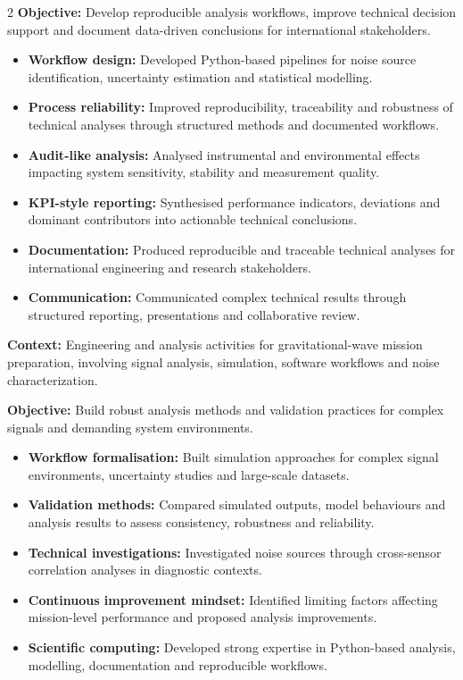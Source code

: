 \documentclass[8pt,a4paper,ragged2e,withhyper]{altacv}
\begin{document}
\begin{paracol}{2}
\textbf{Objective:} Develop reproducible analysis workflows, improve technical decision support and document data-driven conclusions for international stakeholders.

\begin{itemize}
  \item \textbf{Workflow design:} Developed Python-based pipelines for noise source identification, uncertainty estimation and statistical modelling.
  \item \textbf{Process reliability:} Improved reproducibility, traceability and robustness of technical analyses through structured methods and documented workflows.
  \item \textbf{Audit-like analysis:} Analysed instrumental and environmental effects impacting system sensitivity, stability and measurement quality.
  \item \textbf{KPI-style reporting:} Synthesised performance indicators, deviations and dominant contributors into actionable technical conclusions.
  \item \textbf{Documentation:} Produced reproducible and traceable technical analyses for international engineering and research stakeholders.
  \item \textbf{Communication:} Communicated complex technical results through structured reporting, presentations and collaborative review.
\end{itemize}

\divider


\textbf{Context:} Engineering and analysis activities for gravitational-wave mission preparation, involving signal analysis, simulation, software workflows and noise characterization.

\textbf{Objective:} Build robust analysis methods and validation practices for complex signals and demanding system environments.

\begin{itemize}
  \item \textbf{Workflow formalisation:} Built simulation approaches for complex signal environments, uncertainty studies and large-scale datasets.
  \item \textbf{Validation methods:} Compared simulated outputs, model behaviours and analysis results to assess consistency, robustness and reliability.
  \item \textbf{Technical investigations:} Investigated noise sources through cross-sensor correlation analyses in diagnostic contexts.
  \item \textbf{Continuous improvement mindset:} Identified limiting factors affecting mission-level performance and proposed analysis improvements.
  \item \textbf{Scientific computing:} Developed strong expertise in Python-based analysis, modelling, documentation and reproducible workflows.
\end{itemize}


\end{paracol}
\end{document}
